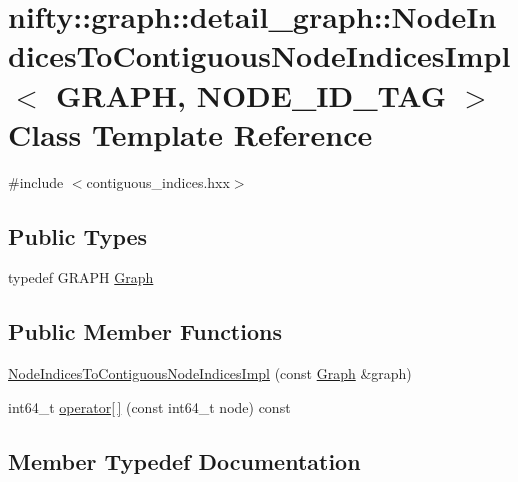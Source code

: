 \hypertarget{classnifty_1_1graph_1_1detail__graph_1_1NodeIndicesToContiguousNodeIndicesImpl}{}\section{nifty\+:\+:graph\+:\+:detail\+\_\+graph\+:\+:Node\+Indices\+To\+Contiguous\+Node\+Indices\+Impl$<$ G\+R\+A\+P\+H, N\+O\+D\+E\+\_\+\+I\+D\+\_\+\+T\+A\+G $>$ Class Template Reference}
\label{classnifty_1_1graph_1_1detail__graph_1_1NodeIndicesToContiguousNodeIndicesImpl}


{\ttfamily \#include $<$contiguous\+\_\+indices.\+hxx$>$}

\subsection*{Public Types}
\begin{DoxyCompactItemize}
\item 
typedef G\+R\+A\+P\+H \hyperlink{classnifty_1_1graph_1_1detail__graph_1_1NodeIndicesToContiguousNodeIndicesImpl_a1fa4e1edf7a5385ea5a4d8311d359c43}{Graph}
\end{DoxyCompactItemize}
\subsection*{Public Member Functions}
\begin{DoxyCompactItemize}
\item 
\hyperlink{classnifty_1_1graph_1_1detail__graph_1_1NodeIndicesToContiguousNodeIndicesImpl_a9282de3d1e50e3f149ab2ab5793cd475}{Node\+Indices\+To\+Contiguous\+Node\+Indices\+Impl} (const \hyperlink{classnifty_1_1graph_1_1detail__graph_1_1NodeIndicesToContiguousNodeIndicesImpl_a1fa4e1edf7a5385ea5a4d8311d359c43}{Graph} \&graph)
\item 
int64\+\_\+t \hyperlink{classnifty_1_1graph_1_1detail__graph_1_1NodeIndicesToContiguousNodeIndicesImpl_aacb68555962ce1d56ec6eb0dca8a1b3b}{operator\mbox{[}$\,$\mbox{]}} (const int64\+\_\+t node) const 
\end{DoxyCompactItemize}


\subsection{Member Typedef Documentation}
\hypertarget{classnifty_1_1graph_1_1detail__graph_1_1NodeIndicesToContiguousNodeIndicesImpl_a1fa4e1edf7a5385ea5a4d8311d359c43}{}
